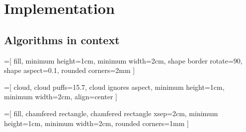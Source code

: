 \chapter{Implementation}

\section{Algorithms in context}


\def \mheight {1cm}
\def \mwidth {2cm}

=[
  fill, 
  minimum height=\mheight, 
  minimum width=\mwidth, 
  shape border rotate=90, 
  shape aspect=0.1,
  rounded corners=2mm
]

=[
  cloud, 
  cloud puffs=15.7, 
  cloud ignores aspect, 
  minimum height=\mheight,
  minimum width=\mwidth, 
  align=center
]

=[
  fill,
  chamfered rectangle,
  chamfered rectangle xsep=2cm,
  minimum height=\mheight, 
  minimum width=\mwidth,
  rounded corners=1mm
]


